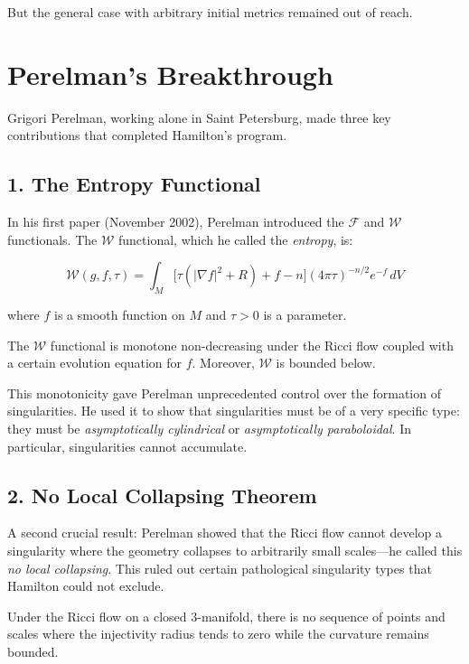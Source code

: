 But the general case with arbitrary initial metrics remained out of reach.

\section{Perelman's Breakthrough}

Grigori Perelman, working alone in Saint Petersburg, made three key contributions that completed Hamilton's program.

\subsection{1. The Entropy Functional}

In his first paper (November 2002), Perelman introduced the $\mathcal{F}$ and $\mathcal{W}$ functionals. The $\mathcal{W}$ functional, which he called the \textit{entropy}, is:

\[
\mathcal{W}(g, f, \tau) = \int_M \bigl[\tau(|\nabla f|^2 + R) + f - n\bigr] (4\pi\tau)^{-n/2} e^{-f} \, dV
\]

where $f$ is a smooth function on $M$ and $\tau > 0$ is a parameter.

\begin{theorem}[Perelman, 2002]
The $\mathcal{W}$ functional is monotone non-decreasing under the Ricci flow coupled with a certain evolution equation for $f$. Moreover, $\mathcal{W}$ is bounded below.
\end{theorem}

This monotonicity gave Perelman unprecedented control over the formation of singularities. He used it to show that singularities must be of a very specific type: they must be \textit{asymptotically cylindrical} or \textit{asymptotically paraboloidal}. In particular, singularities cannot accumulate.

\subsection{2. No Local Collapsing Theorem}

A second crucial result: Perelman showed that the Ricci flow cannot develop a singularity where the geometry collapses to arbitrarily small scales---he called this \textit{no local collapsing}. This ruled out certain pathological singularity types that Hamilton could not exclude.

\begin{theorem}
Under the Ricci flow on a closed 3-manifold, there is no sequence of points and scales where the injectivity radius tends to zero while the curvature remains bounded.
\end{theorem}

